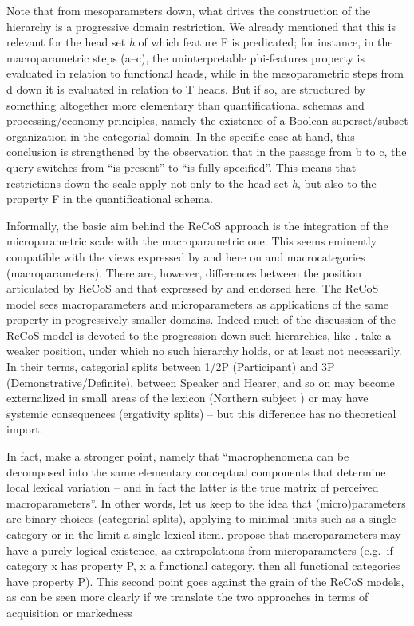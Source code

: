 \documentclass[output=paper]{langsci/langscibook}
\begin{document}
Note that from mesoparameters down, what drives the construction of the
hierarchy is a progressive domain restriction. We already mentioned that this
is relevant for the head set \emph{h} of which feature F is predicated; for
instance, in the macroparametric steps (a--c), the
uninterpretable phi-features property is evaluated in relation to functional
heads, while in the mesoparametric steps from d down it is
evaluated in relation to T heads. But if so,  are structured by
something altogether more elementary than quantificational schemas and
processing/economy principles, namely the existence of a Boolean
superset/subset organization in the categorial domain. In the specific case at
hand, this conclusion is strengthened by the observation that in the passage
from b to c, the query switches from
“is present” to “is fully specified”.  This means that restrictions down the
scale apply not only to the head set \emph{h}, but also to the property F in
the quantificational schema.

Informally, the basic aim behind the ReCoS approach is the integration of the
microparametric scale with the macroparametric one.  This seems eminently
compatible with the views expressed by \citet{ManSav2011} and here on
 and macrocategories (macroparameters). There are, however,
differences between the position articulated by ReCoS and that expressed by
\citet{ManSav2011} and endorsed here. The ReCoS model sees macroparameters and
microparameters as applications of the same property in
progressively smaller domains. Indeed much of the discussion of the ReCoS model
is devoted to the progression down such hierarchies, like .
\citet{ManSav2011} take a weaker position, under which no such hierarchy holds,
or at least not necessarily. In their terms, categorial splits between 1/2P
(Participant) and 3P (Demonstrative/Definite), between Speaker and Hearer, and
so on may become externalized in small areas of the lexicon (Northern
 subject ) or may have systemic consequences
(ergativity splits) – but this difference has no theoretical import.

In fact, \citet{ManSav2011} make a stronger point, namely that
“macrophenomena can be decomposed into the same elementary conceptual
components that determine local lexical variation – and in fact the latter is
the true matrix of perceived macroparameters”. In other words, let us keep to
the idea that (micro)parameters are binary choices (categorial splits),
applying to minimal units such as a single category or in the limit a single
lexical item. \citeauthor{ManSav2011} propose that
macroparameters may have a purely
logical existence, as extrapolations from microparameters (e.g.\ if category x
has property P, x a functional category, then all functional categories have
property P). This second point goes against the grain of the ReCoS models, as
can be seen more clearly if we translate the two approaches in terms of
acquisition or markedness
\end{document}
